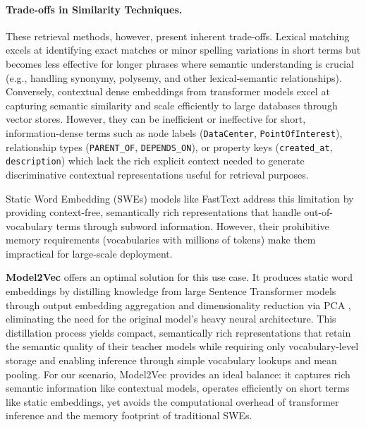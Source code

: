 \paragraph{Trade-offs in Similarity Techniques.}
These retrieval methods, however, present inherent trade-offs. Lexical matching excels at identifying exact matches or minor spelling variations in short terms but becomes less effective for longer phrases where semantic understanding is crucial (e.g., handling synonymy, polysemy, and other lexical-semantic relationships). Conversely, contextual dense embeddings from transformer models excel at capturing semantic similarity and scale efficiently to large databases through vector stores. However, they can be inefficient or ineffective for short, information-dense terms such as node labels (\verb|DataCenter|, \verb|PointOfInterest|), relationship types (\verb|PARENT_OF|, \verb|DEPENDS_ON|), or property keys (\verb|created_at|, \verb|description|) which lack the rich explicit context needed to generate discriminative contextual representations useful for retrieval purposes.

Static Word Embedding (SWEs) models like FastText \cite{bojanowski-etal-2017-enriching} address this limitation by providing context-free, semantically rich representations that handle out-of-vocabulary terms through subword information. However, their prohibitive memory requirements (vocabularies with millions of tokens) make them impractical for large-scale deployment.

\textbf{Model2Vec} \cite{tulkens-2024-model2vec} offers an optimal solution for this use case. It produces static word embeddings by distilling knowledge from large Sentence Transformer models through output embedding aggregation and dimensionality reduction via PCA \cite{shlens-2014-tutorial-pca}, eliminating the need for the original model's heavy neural architecture. This distillation process yields compact, semantically rich representations that retain the semantic quality of their teacher models while requiring only vocabulary-level storage and enabling inference through simple vocabulary lookups and mean pooling. For our scenario, Model2Vec provides an ideal balance: it captures rich semantic information like contextual models, operates efficiently on short terms like static embeddings, yet avoids the computational overhead of transformer inference and the memory footprint of traditional SWEs.

